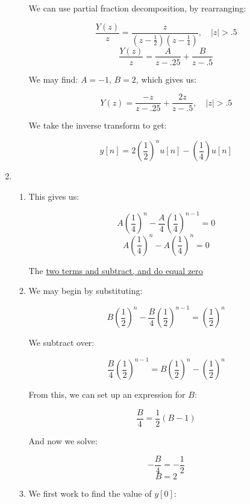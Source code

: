 \begin{enumerate}
\begin{enumerate}
        We can use partial fraction decomposition, by rearranging:

        $$\frac{Y(z)}{z}=\frac{z}{\left( z-\frac{1}{2} \right)\left( z-\frac{1}{4} \right)},\quad |z|>.5$$
        $$\frac{Y(z)}{z}=\frac{A}{z-.25}+\frac{B}{z-.5}$$

        We may find: $A=-1$, $B=2$, which gives us:

        $$Y(z)=\frac{-z}{z-.25}+\frac{2z}{z-.5},\quad |z|>.5$$

        We take the inverse transform to get:

        $$\boxed{y[n]=2\left( \frac{1}{2} \right)^nu[n]-\left(\frac{1}{4}\right)u[n]}$$

    \end{enumerate}

  \item

    \begin{enumerate}

      \item 

        This gives us:

        $$A\left( \frac{1}{4} \right)^{n}-\frac{A}{4}\left( \frac{1}{4} \right)^{n-1}=0$$
        $$A\left( \frac{1}{4} \right)^{n}-A\left( \frac{1}{4} \right)^{n}=0$$

        The \underline{two terms and subtract, and do equal zero} \textcolor{green}{\checkmark}

      \item 

        We may begin by substituting:

        $$B\left( \frac{1}{2} \right)^{n}-\frac{B}{4}\left( \frac{1}{2} \right)^{n-1}=\left( \frac{1}{2} \right)^n$$

        We subtract over:
        
        $$\frac{B}{4}\left( \frac{1}{2} \right)^{n-1}=B\left( \frac{1}{2} \right)^{n}-\left( \frac{1}{2} \right)^n$$

        From this, we can set up an expression for $B$:

        $$\frac{B}{4}=\frac{1}{2}\left( B-1 \right)$$

        And now we solve:

        $$-\frac{B}{4}= -\frac{1}{2}$$
        $$\boxed{B= 2}$$

      \item 

        We first work to find the value of $y[0]$:


\end{enumerate}
\end{enumerate}
